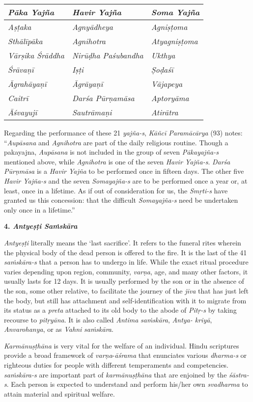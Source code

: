 \begin{longtable}{|l|l|l|}
\hline
\emph{\textbf{Pāka Yajña}} & \emph{\textbf{Havir Yajña}} & \emph{\textbf{Soma Yajña}}\tabularnewline
\hline
\emph{Aṣṭaka} & \emph{Agnyādheya} & \emph{Agniṣṭoma}\tabularnewline
\hline
\emph{Sthālīpāka} & \emph{Agnihotra} & \emph{Atyagniṣṭoma}\tabularnewline
\hline
\emph{Vārṣika Śrāddha} & \emph{Nirūḍha Paśubandha} & \emph{Ukthya}\tabularnewline
\hline
\emph{Śrāvaṇī} & \emph{Iṣṭi} & \emph{Ṣoḍaśī}\tabularnewline
\hline
\emph{Āgrahāyaṇī} & \emph{Āgrāyaṇī} & \emph{Vājapeya}\tabularnewline
\hline
\emph{Caitrī} & \emph{Darśa Pūrṇamāsa} & \emph{Aptoryāma}\tabularnewline
\hline
\emph{Āśvayujī} & \emph{Sautrāmaṇi} & \emph{Atirātra}\tabularnewline
\hline
\end{longtable}

Regarding the performance of these 21 \emph{yajña-s}, \emph{Kāñcī Paramā\-cā\-rya} (93) notes: ``\emph{Aupāsana} and \emph{Agnihotra} are part of the daily religious routine. Though a pakayajna, \emph{Aupāsana} is not included in the group of seven \emph{Pākayajña-s} mentioned above, while \emph{Agnihotra} is one of the seven \emph{Havir Yajña-s}. \emph{Darśa Pūrṇmāsa} is a \emph{Havir Yajña} to be performed once in fifteen days. The other five \emph{Havir Yajña-s} and the seven \emph{Somayajña-s} are to be performed once a year or, at least, once in a lifetime. As if out of consideration for us, the \emph{Smṛti-s} have granted us this concession: that the difficult \emph{Somayajña-s} need be undertaken only once in a lifetime.''

\textbf{4. \emph{Antyeṣṭi Saṁskāra}}

\emph{Antyeṣṭi} literally means the `last sacrifice'. It refers to the funeral rites wherein the physical body of the dead person is offered to the fire. It is the last of the 41 \emph{saṁskāra-s} that a person has to undergo in life. While the exact ritual procedure varies depending upon region, community, \emph{varṇa}, age, and many other factors, it usually lasts for 12 days. It is usually performed by the son or in the absence of the son, some other relative, to facilitate the journey of the \emph{jīva} that has just left the body, but still has attachment and self-identification with it to migrate from its status as a \emph{preta} attached to its old body to the abode of \emph{Pitṛ-s} by taking recourse to \emph{pitṛyāna}. It is also called \emph{Antima} \emph{saṁskāra}, \emph{Antya- kriyā}, \emph{Anvarohanya}, or as \emph{Vahni} \emph{saṁskāra}.

\emph{Karmānuṣṭhāna} is very vital for the welfare of an individual. Hindu scriptures provide a broad framework of \emph{varṇa}-\emph{āśrama} that enunciates various \emph{dharma-s} or righteous duties for people with different temperaments and competencies. \emph{saṁskāra-s} are important part of \emph{karmānuṣṭhāna} that are enjoined by the \emph{śāstra-s}. Each person is expected to understand and perform his/her own \emph{svadharma} to attain material and spiritual welfare.


